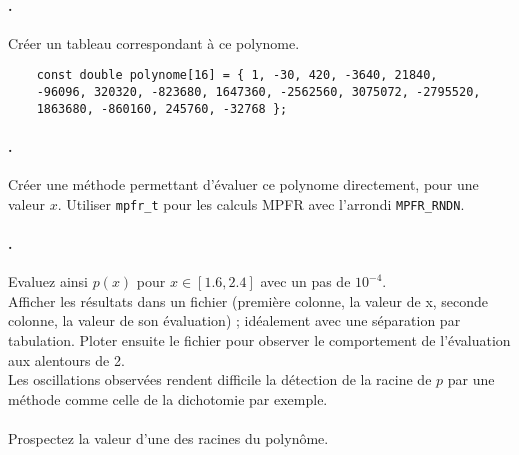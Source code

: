 \documentclass[a4paper,11pt]{exam}
\begin{document}
\paragraph{\theenumii.} Créer un tableau correspondant à ce polynome.
\begin{lstlisting}
	const double polynome[16] = { 1, -30, 420, -3640, 21840, 
	-96096, 320320,	-823680, 1647360, -2562560, 3075072, -2795520, 
	1863680, -860160, 245760, -32768 };
\end{lstlisting}

\paragraph{\theenumii.} Créer une méthode permettant d'évaluer ce polynome directement, pour une valeur $x$. Utiliser \verb=mpfr_t= pour les calculs MPFR avec l'arrondi \verb=MPFR_RNDN=.

\paragraph{\theenumii.} Evaluez ainsi $p(x)$ pour $x \in \left[ 1.6,2.4 \right]$ avec un pas de $10^{-4}$. \\
Afficher les résultats dans un fichier (première colonne, la valeur de x, seconde colonne, la valeur de son évaluation) ; idéalement avec une séparation par tabulation. Ploter ensuite le fichier pour observer le comportement de l'évaluation aux alentours de 2.
\\ Les oscillations observées rendent difficile la détection de la racine de $p$ par une méthode comme celle de la dichotomie par exemple.\\
\\Prospectez la valeur d'une des racines du polynôme.
\end{document}
